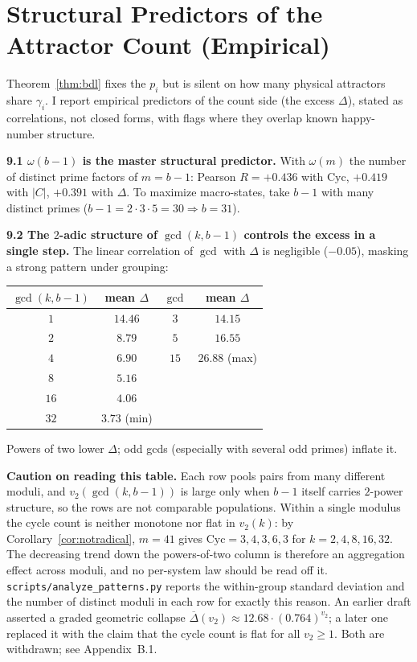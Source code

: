 \documentclass[11pt]{article}
\theoremstyle{definition}
\theoremstyle{remark}
\newcommand{\Cyc}{\mathrm{Cyc}}
\begin{document}
\section{Structural Predictors of the Attractor Count (Empirical)}\label{sec:predictors}

Theorem~\ref{thm:bdl} fixes the $p_i$ but is silent on how many physical attractors share $\gamma_i$. I report empirical predictors of the count side (the excess $\Delta$), stated as correlations, not closed forms, with flags where they overlap known happy-number structure.

\medskip
\noindent\textbf{9.1 $\omega(b-1)$ is the master structural predictor.} With $\omega(m)$ the number of distinct prime factors of $m = b-1$: Pearson $R = +0.436$ with $\Cyc$, $+0.419$ with $|C|$, $+0.391$ with $\Delta$. To maximize macro-states, take $b-1$ with many distinct primes ($b-1 = 2\cdot3\cdot5 = 30 \Rightarrow b = 31$).

\medskip
\noindent\textbf{9.2 The $2$-adic structure of $\gcd(k, b-1)$ controls the excess in a single step.} The linear correlation of $\gcd$ with $\Delta$ is negligible ($-0.05$), masking a strong pattern under grouping:

\begin{center}
\begin{tabular}{@{}cc@{\qquad}cc@{}}
\toprule
$\gcd(k,b-1)$ & mean $\Delta$ & $\gcd$ & mean $\Delta$ \\
\midrule
$1$ & $14.46$ & $3$ & $14.15$ \\
$2$ & $8.79$ & $5$ & $16.55$ \\
$4$ & $6.90$ & $15$ & $26.88$ (max) \\
$8$ & $5.16$ & & \\
$16$ & $4.06$ & & \\
$32$ & $3.73$ (min) & & \\
\bottomrule
\end{tabular}
\end{center}

Powers of two lower $\Delta$; odd gcds (especially with several odd primes) inflate it.

\textbf{Caution on reading this table.} Each row pools pairs from many different moduli, and $v_2(\gcd(k,b-1))$ is large only when $b-1$ itself carries $2$-power structure, so the rows are not comparable populations. Within a single modulus the cycle count is neither monotone nor flat in $v_2(k)$: by Corollary~\ref{cor:notradical}, $m=41$ gives $\Cyc = 3, 4, 3, 6, 3$ for $k = 2, 4, 8, 16, 32$. The decreasing trend down the powers-of-two column is therefore an aggregation effect across moduli, and no per-system law should be read off it. \texttt{scripts/analyze\_patterns.py} reports the within-group standard deviation and the number of distinct moduli in each row for exactly this reason. An earlier draft asserted a graded geometric collapse $\overline{\Delta}(v_2) \approx 12.68 \cdot (0.764)^{v_2}$; a later one replaced it with the claim that the cycle count is flat for all $v_2 \ge 1$. Both are withdrawn; see Appendix~B.1.
\end{document}
